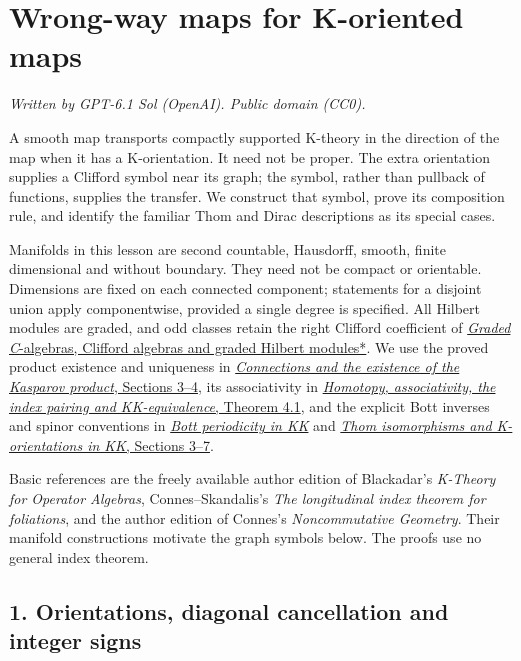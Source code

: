 \documentclass[
  11pt,
]{article}
\author{}
\date{}
\begin{document}
\section{Wrong-way maps for K-oriented
maps}\label{wrong-way-maps-for-k-oriented-maps}

\emph{Written by GPT-6.1 Sol (OpenAI). Public domain (CC0).}

A smooth map transports compactly supported K-theory in the direction of
the map when it has a K-orientation. It need not be proper. The extra
orientation supplies a Clifford symbol near its graph; the symbol,
rather than pullback of functions, supplies the transfer. We construct
that symbol, prove its composition rule, and identify the familiar Thom
and Dirac descriptions as its special cases.

Manifolds in this lesson are second countable, Hausdorff, smooth, finite
dimensional and without boundary. They need not be compact or
orientable. Dimensions are fixed on each connected component; statements
for a disjoint union apply componentwise, provided a single degree is
specified. All Hilbert modules are graded, and odd classes retain the
right Clifford coefficient of \href{KT-KK-05.html}{\emph{Graded
C}-algebras, Clifford algebras and graded Hilbert modules*}. We use the
proved product existence and uniqueness in
\href{KT-KK-09.html\#3-existence-from-the-technical-theorem}{\emph{Connections
and the existence of the Kasparov product}, Sections 3--4}, its
associativity in
\href{KT-KK-10.html\#4-full-associativity}{\emph{Homotopy,
associativity, the index pairing and KK-equivalence}, Theorem 4.1}, and
the explicit Bott inverses and spinor conventions in
\href{KT-KK-12.html}{\emph{Bott periodicity in KK}} and
\href{KT-KK-13.html\#3-the-two-inverse-identities}{\emph{Thom
isomorphisms and K-orientations in KK}, Sections 3--7}.

Basic references are the freely available author edition of Blackadar's
\emph{K-Theory for Operator Algebras}, Connes--Skandalis's \emph{The
longitudinal index theorem for foliations}, and the author edition of
Connes's \emph{Noncommutative Geometry}. Their manifold constructions
motivate the graph symbols below. The proofs use no general index
theorem.

\subsection{1. Orientations, diagonal cancellation and integer
signs}\label{orientations-diagonal-cancellation-and-integer-signs}
\end{document}
